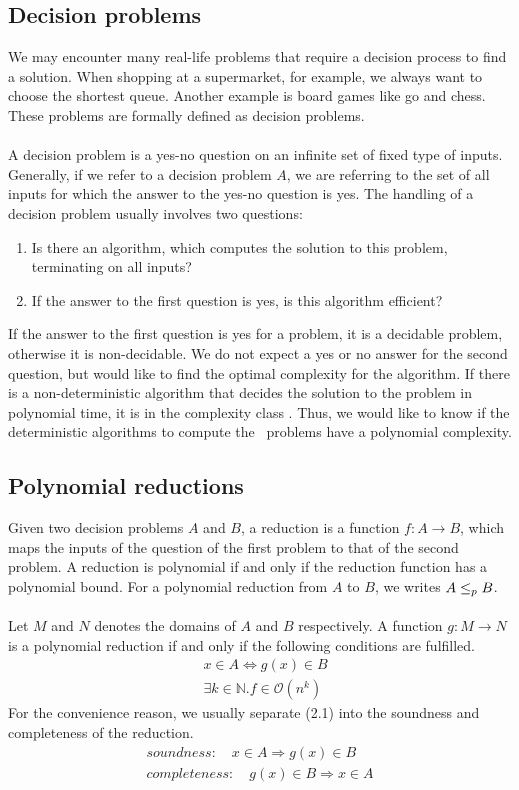 \subsection{Decision problems}
We may encounter many real-life problems that require a decision process to find a solution. When shopping at a supermarket, for example, we always want to choose the shortest queue. Another example is board games like go and chess. These problems are formally defined as decision problems. \\\\
A decision problem is a yes-no question on an infinite set of fixed type of inputs. Generally, if we refer to a decision problem $A$, we are referring to the set of all inputs for which the answer to the yes-no question is yes. The handling of a decision problem usually involves two questions:
\begin{enumerate}
    \item Is there an algorithm, which computes the solution to this problem, terminating on all inputs?
    \item If the answer to the first question is yes, is this algorithm efficient?
\end{enumerate}
If the answer to the first question is yes for a problem, it is a decidable problem, otherwise it is non-decidable. We do not expect a yes or no answer for the second question, but would like to find the optimal complexity for the algorithm. If there is a non-deterministic algorithm that decides the solution to the problem in polynomial time, it is in the complexity class \NPH.
Thus, we would like to know if the deterministic algorithms to compute the \NPH\ problems have a polynomial complexity.

\subsection{Polynomial reductions}
Given two decision problems $A$ and $B$, 
a reduction is a function $f: A \rightarrow B$, 
which maps the inputs of the question of the first problem 
to that of the second problem. A reduction is polynomial 
if and only if the reduction function has a polynomial bound. 
For a polynomial reduction from $A$ to $B$, we writes $A \leq_p B$. \\ \\
Let $M$ and $N$ denotes the domains of $A$ and $B$ respectively. 
A function $g: M \rightarrow N$ is a polynomial reduction 
if and only if the following conditions are fulfilled.
\begin{align}  
    &x \in A \iff g(x) \in B \\
    &\exists k\in \mathbb{N}. f \in \mathcal{O}(n^k)
\end{align}
For the convenience reason, we usually separate (2.1) into the soundness and completeness of the reduction.
\begin{align}
    soundness: \quad x \in A \Longrightarrow g(x) \in B \\
    completeness: \quad g(x) \in B \Longrightarrow x \in A
\end{align}

